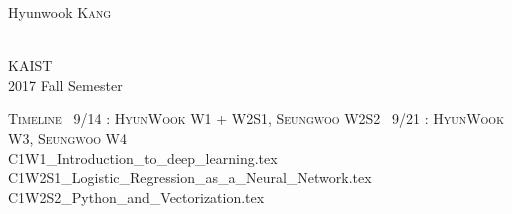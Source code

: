 \documentclass[twoside]{article}
\begin{document}
\begin{titlepage}
\begin{minipage}{0.4\textwidth}
\begin{flushright}
Hyunwook \textsc{Kang} %
\end{flushright}
\end{minipage}\\[4cm]


\textsc{KAIST}\\[1.5cm] %


2017 Fall Semester


 


\end{titlepage}


\tableofcontents
\newpage
\textsc{ Timeline \newline ~9/14 : HyunWook W1 + W2S1, Seungwoo W2S2 \newline  ~9/21 : HyunWook W3, Seungwoo W4}\\[1.5cm]
\newpage
%
{C1W1_Introduction_to_deep_learning.tex}
{C1W2S1_Logistic_Regression_as_a_Neural_Network.tex}
{C1W2S2_Python_and_Vectorization.tex}
\end{document}

